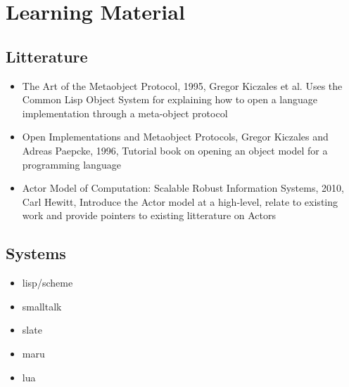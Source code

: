 \section{Learning Material}

\subsection{Litterature}
\begin{itemize}
    \item The Art of the Metaobject Protocol, 1995, Gregor Kiczales et al. Uses
        the Common Lisp Object System for explaining how to open a
        language implementation through a meta-object protocol
    \item Open Implementations and Metaobject Protocols, Gregor Kiczales and
        Adreas Paepcke, 1996, Tutorial book on opening an object model for a
        programming language
    \item Actor Model of Computation: Scalable Robust Information Systems,
        2010, Carl Hewitt, Introduce the Actor model at a high-level, relate to
        existing work and provide pointers to existing litterature on Actors
\end{itemize}


\subsection{Systems}
\begin{itemize}
    \item lisp/scheme
    \item smalltalk
    \item slate
    \item maru
    \item lua
\end{itemize}
